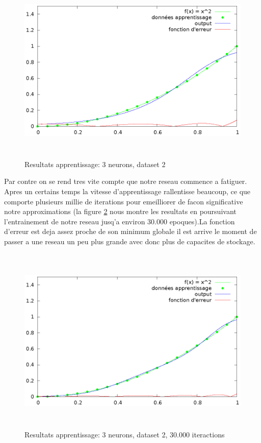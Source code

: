 \documentclass[twoside,openright,a4paper,11pt,french]{article}
\begin{document}
\begin{figure}[h]
\centering
\includegraphics[width=12cm,height=9cm]{./pics/chartsqtest2.eps}
\caption{Resultats apprentissage: 3 neurons, dataset 2}
\label{fig:chartsqtest2}
\end{figure}

Par contre on se rend tres vite compte que notre reseau commence a fatiguer.
Apres un certains temps la vitesse d'apprentissage rallentisse beaucoup, 
ce que comporte plusieurs millie de iterations pour emeilliorer de facon 
significative notre approximations (la figure \ref{fig:chartsqtest3} nous
montre les resultats en poursuivant l'entrainement de notre reseau jusq'a
environ 30.000 epoques).La fonction d'erreur est deja assez proche de son minimum 
globale il est arrive le moment de passer a une reseau un peu plus grande 
avec donc plus de capacites de stockage.


\begin{figure}[h]
\centering
\includegraphics[width=12cm,height=9cm]{./pics/chartsqtest3.eps}
\caption{Resultats apprentissage: 3 neurons, dataset 2, 30.000 iteractions}
\label{fig:chartsqtest3}
\end{figure}
\end{document}
